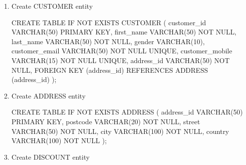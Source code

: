 \documentclass[
  letterpaper,
  DIV=11,
  numbers=noendperiod]{scrartcl}
\newenvironment{Shaded}{\begin{snugshade}}{\end{snugshade}}
\newcommand{\ControlFlowTok}[1]{\textcolor[rgb]{0.00,0.23,0.31}{#1}}
\newcommand{\DataTypeTok}[1]{\textcolor[rgb]{0.68,0.00,0.00}{#1}}
\newcommand{\DecValTok}[1]{\textcolor[rgb]{0.68,0.00,0.00}{#1}}
\newcommand{\KeywordTok}[1]{\textcolor[rgb]{0.00,0.23,0.31}{#1}}
\newcommand{\NormalTok}[1]{\textcolor[rgb]{0.00,0.23,0.31}{#1}}
\begin{document}
\begin{enumerate}
\def\labelenumi{\arabic{enumi}.}
\item
  Create CUSTOMER entity

\begin{Shaded}
\begin{Highlighting}[]
\KeywordTok{CREATE} \KeywordTok{TABLE} \ControlFlowTok{IF} \KeywordTok{NOT} \KeywordTok{EXISTS}\NormalTok{ CUSTOMER (}
\NormalTok{  customer\_id }\DataTypeTok{VARCHAR}\NormalTok{(}\DecValTok{50}\NormalTok{) }\KeywordTok{PRIMARY} \KeywordTok{KEY}\NormalTok{, }
\NormalTok{  first\_name }\DataTypeTok{VARCHAR}\NormalTok{(}\DecValTok{50}\NormalTok{) }\KeywordTok{NOT} \KeywordTok{NULL}\NormalTok{,}
\NormalTok{  last\_name }\DataTypeTok{VARCHAR}\NormalTok{(}\DecValTok{50}\NormalTok{) }\KeywordTok{NOT} \KeywordTok{NULL}\NormalTok{,}
\NormalTok{  gender }\DataTypeTok{VARCHAR}\NormalTok{(}\DecValTok{10}\NormalTok{),}
\NormalTok{  customer\_email }\DataTypeTok{VARCHAR}\NormalTok{(}\DecValTok{50}\NormalTok{) }\KeywordTok{NOT} \KeywordTok{NULL} \KeywordTok{UNIQUE}\NormalTok{,}
\NormalTok{  customer\_mobile }\DataTypeTok{VARCHAR}\NormalTok{(}\DecValTok{15}\NormalTok{) }\KeywordTok{NOT} \KeywordTok{NULL} \KeywordTok{UNIQUE}\NormalTok{,}
\NormalTok{  address\_id }\DataTypeTok{VARCHAR}\NormalTok{(}\DecValTok{50}\NormalTok{) }\KeywordTok{NOT} \KeywordTok{NULL}\NormalTok{,}
  \KeywordTok{FOREIGN} \KeywordTok{KEY}\NormalTok{ (address\_id) }\KeywordTok{REFERENCES}\NormalTok{ ADDRESS (address\_id)}
\NormalTok{);}
\end{Highlighting}
\end{Shaded}
\item
  Create ADDRESS entity

\begin{Shaded}
\begin{Highlighting}[]
\KeywordTok{CREATE} \KeywordTok{TABLE} \ControlFlowTok{IF} \KeywordTok{NOT} \KeywordTok{EXISTS}\NormalTok{ ADDRESS (}
\NormalTok{  address\_id }\DataTypeTok{VARCHAR}\NormalTok{(}\DecValTok{50}\NormalTok{) }\KeywordTok{PRIMARY} \KeywordTok{KEY}\NormalTok{,}
\NormalTok{  postcode }\DataTypeTok{VARCHAR}\NormalTok{(}\DecValTok{20}\NormalTok{) }\KeywordTok{NOT} \KeywordTok{NULL}\NormalTok{, }
\NormalTok{  street }\DataTypeTok{VARCHAR}\NormalTok{(}\DecValTok{50}\NormalTok{) }\KeywordTok{NOT} \KeywordTok{NULL}\NormalTok{,}
\NormalTok{  city }\DataTypeTok{VARCHAR}\NormalTok{(}\DecValTok{100}\NormalTok{) }\KeywordTok{NOT} \KeywordTok{NULL}\NormalTok{,}
\NormalTok{  country }\DataTypeTok{VARCHAR}\NormalTok{(}\DecValTok{100}\NormalTok{) }\KeywordTok{NOT} \KeywordTok{NULL}
\NormalTok{  );}
\end{Highlighting}
\end{Shaded}
\item
  Create DISCOUNT entity


\end{enumerate}
\end{document}
